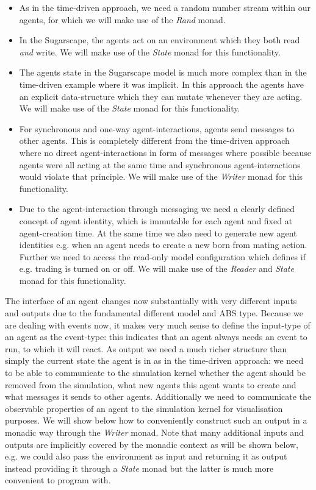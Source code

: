 \begin{itemize}
	\item As in the time-driven approach, we need a random number stream within our agents, for which we will make use of the \textit{Rand} monad.
	
	\item In the Sugarscape, the agents act on an environment which they both read \textit{and} write. We will make use of the \textit{State} monad for this functionality. 
	
	\item The agents state in the Sugarscape model is much more complex than in the time-driven example where it was implicit. In this approach the agents have an explicit data-structure which they can mutate whenever they are acting. We will make use of the \textit{State} monad for this functionality.
	
	\item For synchronous and one-way agent-interactions, agents send messages to other agents. This is completely different from the time-driven approach where no direct agent-interactions in form of messages where possible because agents were all acting at the same time and synchronous agent-interactions would violate that principle. We will make use of the \textit{Writer} monad for this functionality.

	\item Due to the agent-interaction through messaging we need a clearly defined concept of agent identity, which is immutable for each agent and fixed at agent-creation time. At the same time we also need to generate new agent identities e.g. when an agent needs to create a new born from mating action. Further we need to access the read-only model configuration which defines if e.g. trading is turned on or off. We will make use of the \textit{Reader} and \textit{State} monad for this functionality.
\end{itemize}

The interface of an agent changes now substantially with very different inputs and outputs due to the fundamental different model and ABS type. Because we are dealing with events now, it makes very much sense to define the input-type of an agent as the event-type: this indicates that an agent always needs an event to run, to which it will react. As output we need a much richer structure than simply the current state the agent is in as in the time-driven approach: we need to be able to communicate to the simulation kernel whether the agent should be removed from the simulation, what new agents this agent wants to create and what messages it sends to other agents. Additionally we need to communicate the observable properties of an agent to the simulation kernel for visualisation purposes. We will show below how to conveniently construct such an output in a monadic way through the \textit{Writer} monad. Note that many additional inputs and outputs are implicitly covered by the monadic context as will be shown below, e.g. we could also pass the environment as input and returning it as output instead providing it through a \textit{State} monad but the latter is much more convenient to program with.

